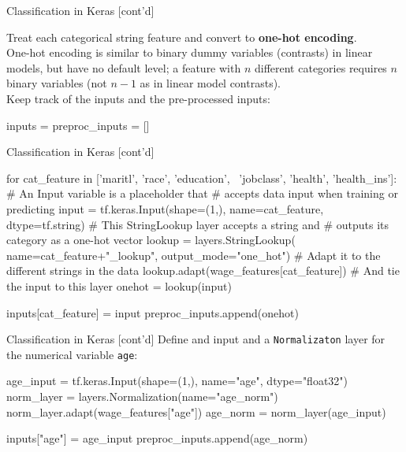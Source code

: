 \documentclass[ignorenonframetext,xcolor=x11names]{beamer}
\begin{document}
\begin{frame}[fragile]{Classification in Keras \small [cont'd]}

Treat each categorical string feature and convert to \textbf{one-hot encoding}. \\

One-hot encoding is similar to binary dummy variables (contrasts) in linear models, but have no default level; a feature with $n$ different categories requires $n$ binary variables (not $n-1$ as in linear model contrasts). \\

Keep track of the inputs and the pre-processed inputs:
\begin{pythoncode}
inputs = {}
preproc_inputs = []
\end{pythoncode}
\end{frame}

\begin{frame}[fragile]{Classification in Keras \small [cont'd]}
\begin{pythoncode}
for cat_feature in ['maritl', 'race', 'education', \
               'jobclass', 'health', 'health_ins']:
    # An Input variable is a placeholder that
    # accepts data input when training or predicting
    input = tf.keras.Input(shape=(1,), 
                           name=cat_feature, 
                           dtype=tf.string)
    # This StringLookup layer accepts a string and 
    # outputs its category as a one-hot vector
    lookup = layers.StringLookup(
        name=cat_feature+"_lookup",
        output_mode="one_hot")
    # Adapt it to the different strings in the data
    lookup.adapt(wage_features[cat_feature])
    # And tie the input to this layer
    onehot = lookup(input)
    
    inputs[cat_feature] = input
    preproc_inputs.append(onehot)
\end{pythoncode}
\end{frame}

\begin{frame}[fragile]{Classification in Keras \small [cont'd]}
Define and input and a \texttt{Normalizaton} layer for the numerical variable \texttt{age}:
\begin{pythoncode}
age_input = tf.keras.Input(shape=(1,), 
                           name="age", 
                           dtype="float32")
norm_layer = layers.Normalization(name="age_norm")
norm_layer.adapt(wage_features["age"])
age_norm = norm_layer(age_input)

inputs["age"] = age_input
preproc_inputs.append(age_norm)
\end{pythoncode}
\end{frame}
\end{document}
